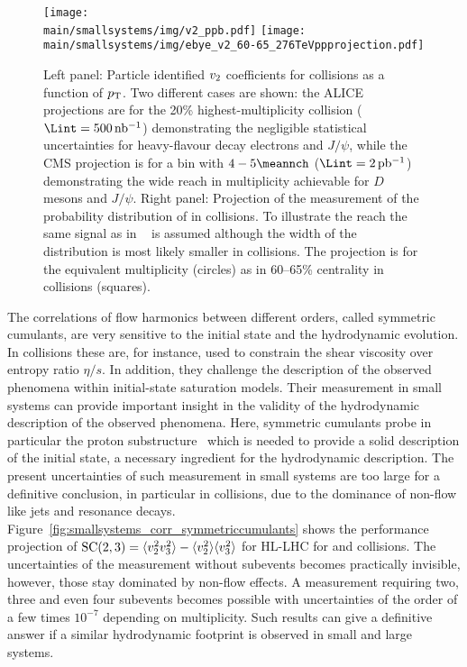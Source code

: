 \documentclass[../report.tex]{subfiles}
\providecommand{\main}{..}
\begin{document}
\begin{figure}[t!]
\centering
\texttt{[image: \\main/smallsystems/img/v2\_ppb.pdf]}
\hfill
\texttt{[image: \\main/smallsystems/img/ebye\_v2\_60-65\_276TeVppprojection.pdf]}
\caption{Left panel: Particle identified $v_{\rm{2}}$ coefficients for \pPb collisions as a function of $p\sb{\scriptstyle\mathrm{T}}$. Two different cases are shown: the ALICE projections are for the 20\% highest-multiplicity collision ($\Lint = \unit[500]{nb^{-1}}$) demonstrating the negligible statistical uncertainties for heavy-flavour decay electrons and $J/\psi$, while the CMS projection is for a bin with $4-5 \meannch$ ($\Lint = \unit[2]{pb^{-1}}$) demonstrating the wide reach in multiplicity achievable for $D$ mesons and $J/\psi$. 
Right panel: Projection of the measurement of the probability distribution of \vtwo in \pp collisions. To illustrate the reach the same signal as in \PbPb~\cite{Aad:2013xma} is assumed although the width of the distribution is most likely smaller in \pp collisions. The projection is for the equivalent \pp multiplicity (circles) as in 60--65\% centrality in \PbPb collisions (squares).}
\label{fig:smallsystems_corr_pid_pvn}
\end{figure}

The correlations of flow harmonics between different orders, called symmetric cumulants, are very sensitive to the initial state and the hydrodynamic evolution. In \PbPb collisions these are, for instance, used to constrain the shear viscosity over entropy ratio $\eta/s$. In addition, they challenge the description of the observed phenomena within initial-state saturation models.
Their measurement in small systems can provide important insight in the validity of the hydrodynamic description of the observed phenomena. Here, symmetric cumulants probe in particular the proton substructure~\cite{Albacete:2017ajt} which is needed to provide a solid description of the initial state, a necessary ingredient for the hydrodynamic description.
The present uncertainties of such measurement in small systems are too large for a definitive conclusion, in particular in \pp collisions, due to the dominance of non-flow like jets and resonance decays. Figure~\ref{fig:smallsystems_corr_symmetriccumulants} shows the performance projection of ${\rm SC}(2,3) = \langle v_2^2 v_3^2 \rangle - \langle v_2^2 \rangle \langle v_3^2 \rangle$ for HL-LHC for \pp and \pPb collisions. The uncertainties of the measurement without subevents becomes practically invisible, however, those stay dominated by non-flow effects. A measurement requiring two, three and even four subevents becomes possible with uncertainties of the order of a few times $10^{-7}$ depending on multiplicity. Such results can give a definitive answer if a similar hydrodynamic footprint is observed in small and large systems.
\end{document}

